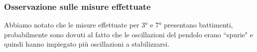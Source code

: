 \subsubsection*{Osservazione sulle misure effettuate}
Abbiamo notato che le misure effettuate per 3° e 7° presentano battimenti, probabilmente sono dovuti al fatto che le oscillazioni del pendolo erano ``spurie" e quindi hanno impiegato più oscillazioni a stabilizzarsi.\\


%    
